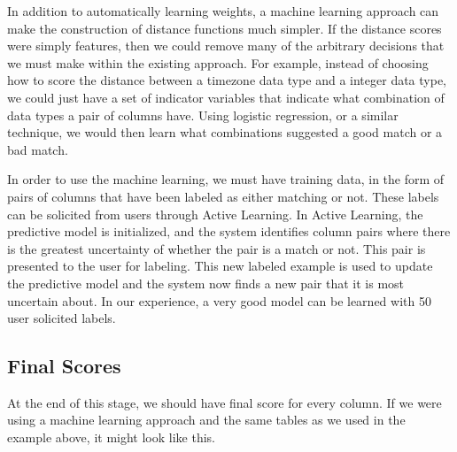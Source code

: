 \documentclass{datamade}
\theoremstyle{definition}
\theoremstyle{remark}
\begin{document}
In addition to automatically learning weights, a machine learning
approach can make the construction of distance functions much
simpler. If the distance scores were simply features, then we could
remove many of the arbitrary decisions that we must make within the
existing approach. For example, instead of choosing how to score the
distance between a timezone data type and a integer data type, we could
just have a set of indicator variables that indicate what combination
of data types a pair of columns have. Using logistic regression, or a
similar technique, we would then learn what combinations suggested a
good match or a bad match.

In order to use the machine learning, we must have training
data, in the form of pairs of columns that have been labeled as either
matching or not. These labels can be solicited from users through
Active Learning. In Active Learning, the predictive model is
initialized, and the system identifies column pairs where there is the
greatest uncertainty of whether the pair is a match or not. This pair
is presented to the user for labeling. This new labeled example is
used to update the predictive model and the system now finds a new
pair that it is most uncertain about. In our experience, a very good
model can be learned with 50 user solicited labels.

\subsection*{Final Scores}
At the end of this stage, we should have final score for every
column. If we were using a machine learning approach and the same
tables as we used in the example above, it might look like this.
\end{document}
